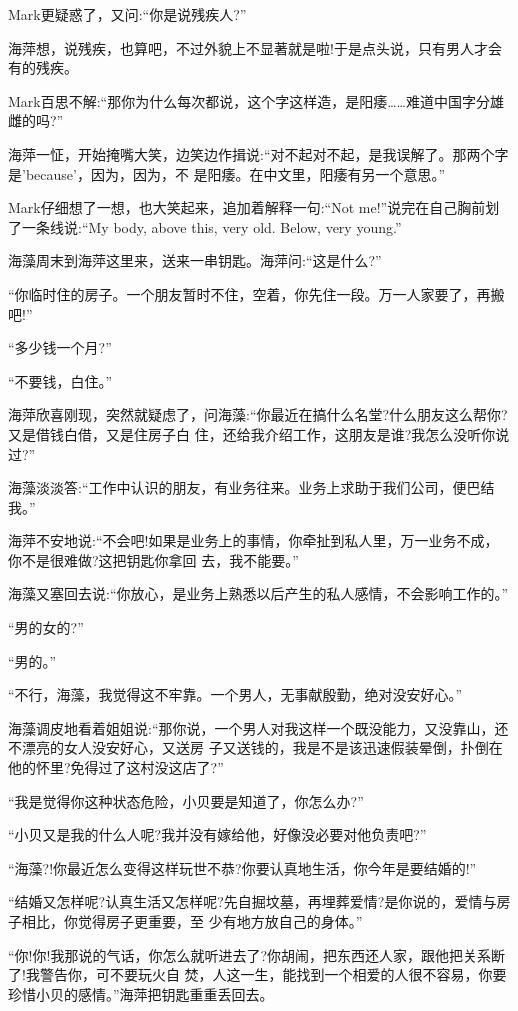 \documentclass[11pt,a4paper,onecolumn]{article}
\begin{document}
Mark更疑惑了，又问:``你是说残疾人?''

海萍想，说残疾，也算吧，不过外貌上不显著就是啦!于是点头说，只有男人才会有的残疾。

Mark百思不解:``那你为什么每次都说，这个字这样造，是阳痿……难道中国字分雄雌的吗?''

海萍一怔，开始掩嘴大笑，边笑边作揖说:``对不起对不起，是我误解了。那两个字是'because'，因为，因为，不
是阳痿。在中文里，阳痿有另一个意思。''

Mark仔细想了一想，也大笑起来，追加着解释一句:``Not me!''说完在自己胸前划了一条线说:``My body, above
this, very old. Below, very young.''

海藻周末到海萍这里来，送来一串钥匙。海萍问:``这是什么?''

``你临时住的房子。一个朋友暂时不住，空着，你先住一段。万一人家要了，再搬吧!''

``多少钱一个月?''

``不要钱，白住。''

海萍欣喜刚现，突然就疑虑了，问海藻:``你最近在搞什么名堂?什么朋友这么帮你?又是借钱白借，又是住房子白
住，还给我介绍工作，这朋友是谁?我怎么没听你说过?''

海藻淡淡答:``工作中认识的朋友，有业务往来。业务上求助于我们公司，便巴结我。''

海萍不安地说:``不会吧!如果是业务上的事情，你牵扯到私人里，万一业务不成，你不是很难做?这把钥匙你拿回
去，我不能要。''

海藻又塞回去说:``你放心，是业务上熟悉以后产生的私人感情，不会影响工作的。''

``男的女的?''

``男的。''

``不行，海藻，我觉得这不牢靠。一个男人，无事献殷勤，绝对没安好心。''

海藻调皮地看着姐姐说:``那你说，一个男人对我这样一个既没能力，又没靠山，还不漂亮的女人没安好心，又送房
子又送钱的，我是不是该迅速假装晕倒，扑倒在他的怀里?免得过了这村没这店了?''

``我是觉得你这种状态危险，小贝要是知道了，你怎么办?''

``小贝又是我的什么人呢?我并没有嫁给他，好像没必要对他负责吧?''

``海藻?!你最近怎么变得这样玩世不恭?你要认真地生活，你今年是要结婚的!''

``结婚又怎样呢?认真生活又怎样呢?先自掘坟墓，再埋葬爱情?是你说的，爱情与房子相比，你觉得房子更重要，至
少有地方放自己的身体。''

``你!你!我那说的气话，你怎么就听进去了?你胡闹，把东西还人家，跟他把关系断了!我警告你，可不要玩火自
焚，人这一生，能找到一个相爱的人很不容易，你要珍惜小贝的感情。''海萍把钥匙重重丢回去。
\end{document}
